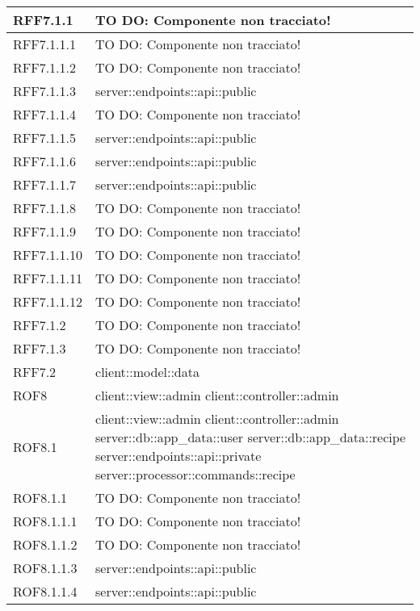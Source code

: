 \begin{center}
\begin{longtable}{| p{4cm} | p{8cm} |}
\hline
RFF7.1.1 & TO DO: Componente non tracciato! \\
\hline
RFF7.1.1.1 & TO DO: Componente non tracciato! \\
\hline
RFF7.1.1.2 & TO DO: Componente non tracciato! \\
\hline
RFF7.1.1.3 & server::endpoints::api::public \\
\hline
RFF7.1.1.4 & TO DO: Componente non tracciato! \\
\hline
RFF7.1.1.5 & server::endpoints::api::public \\
\hline
RFF7.1.1.6 & server::endpoints::api::public \\
\hline
RFF7.1.1.7 & server::endpoints::api::public \\
\hline
RFF7.1.1.8 & TO DO: Componente non tracciato! \\
\hline
RFF7.1.1.9 & TO DO: Componente non tracciato! \\
\hline
RFF7.1.1.10 & TO DO: Componente non tracciato! \\
\hline
RFF7.1.1.11 & TO DO: Componente non tracciato! \\
\hline
RFF7.1.1.12 & TO DO: Componente non tracciato! \\
\hline
RFF7.1.2 & TO DO: Componente non tracciato! \\
\hline
RFF7.1.3 & TO DO: Componente non tracciato! \\
\hline
RFF7.2 & client::model::data \\
\hline
ROF8 & client::view::admin \newline client::controller::admin \\
\hline
ROF8.1 & client::view::admin \newline client::controller::admin \newline server::db::app\_data::user \newline server::db::app\_data::recipe \newline server::endpoints::api::private \newline server::processor::commands::recipe \\
\hline
ROF8.1.1 & TO DO: Componente non tracciato! \\
\hline
ROF8.1.1.1 & TO DO: Componente non tracciato! \\
\hline
ROF8.1.1.2 & TO DO: Componente non tracciato! \\
\hline
ROF8.1.1.3 & server::endpoints::api::public \\
\hline
ROF8.1.1.4 & server::endpoints::api::public \\

\end{longtable}
\end{center}
